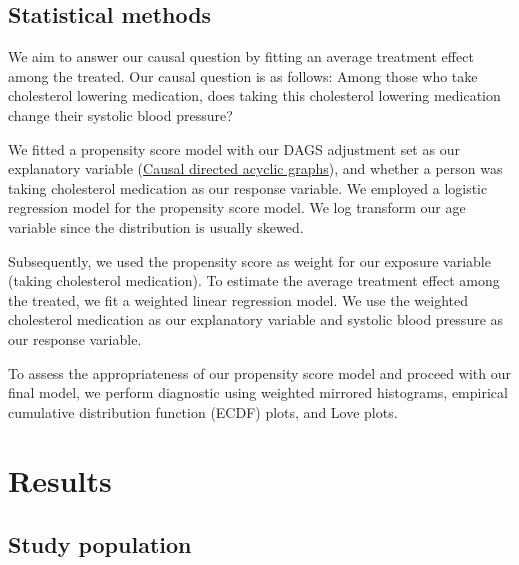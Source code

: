 \documentclass[useAMS,usenatbib,referee]{biom}
\begin{document}
\hypertarget{statistical-methods}{%
\subsection{Statistical methods}\label{statistical-methods}}

We aim to answer our causal question by fitting an average treatment
effect among the treated. Our causal question is as follows: Among those
who take cholesterol lowering medication, does taking this cholesterol
lowering medication change their systolic blood pressure?

We fitted a propensity score model with our DAGS adjustment set as our
explanatory variable (\protect\hyperlink{dags}{Causal directed acyclic
graphs}), and whether a person was taking cholesterol medication as our
response variable. We employed a logistic regression model for the
propensity score model. We log transform our age variable since the
distribution is usually skewed.

Subsequently, we used the propensity score as weight for our exposure
variable (taking cholesterol medication). To estimate the average
treatment effect among the treated, we fit a weighted linear regression
model. We use the weighted cholesterol medication as our explanatory
variable and systolic blood pressure as our response variable.

To assess the appropriateness of our propensity score model and proceed
with our final model, we perform diagnostic using weighted mirrored
histograms, empirical cumulative distribution function (ECDF) plots, and
Love plots.

\hypertarget{results}{%
\section{Results}\label{results}}

\hypertarget{study-population}{%
\subsection{Study population}\label{study-population}}
\end{document}
